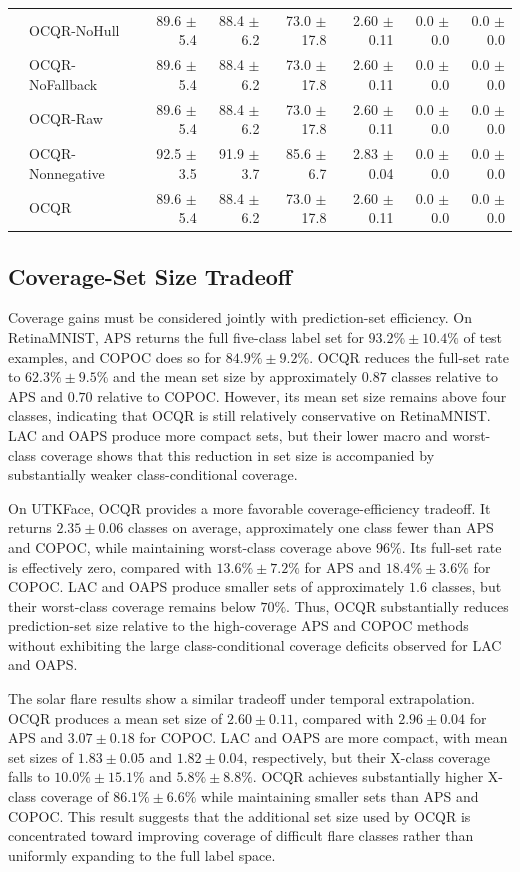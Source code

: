 \documentclass[conference]{IEEEtran}
\begin{document}
\begin{table}[t]
{\begin{tabular}{llrrrrrr}
& OCQR-NoHull & 89.6 $\pm$ 5.4 & 88.4 $\pm$ 6.2 & 73.0 $\pm$ 17.8 & 2.60 $\pm$ 0.11 & 0.0 $\pm$ 0.0 & 0.0 $\pm$ 0.0 \\
& OCQR-NoFallback & 89.6 $\pm$ 5.4 & 88.4 $\pm$ 6.2 & 73.0 $\pm$ 17.8 & 2.60 $\pm$ 0.11 & 0.0 $\pm$ 0.0 & 0.0 $\pm$ 0.0 \\
& OCQR-Raw & 89.6 $\pm$ 5.4 & 88.4 $\pm$ 6.2 & 73.0 $\pm$ 17.8 & 2.60 $\pm$ 0.11 & 0.0 $\pm$ 0.0 & 0.0 $\pm$ 0.0 \\
& OCQR-Nonnegative & 92.5 $\pm$ 3.5 & 91.9 $\pm$ 3.7 & 85.6 $\pm$ 6.7 & 2.83 $\pm$ 0.04 & 0.0 $\pm$ 0.0 & 0.0 $\pm$ 0.0 \\
& OCQR & 89.6 $\pm$ 5.4 & 88.4 $\pm$ 6.2 & 73.0 $\pm$ 17.8 & 2.60 $\pm$ 0.11 & 0.0 $\pm$ 0.0 & 0.0 $\pm$ 0.0 \\
\bottomrule
\end{tabular}
}
\end{table}

\subsection{Coverage-Set Size Tradeoff}
Coverage gains must be considered jointly with prediction-set efficiency. On RetinaMNIST, APS returns the full five-class label set for \(93.2\%\pm10.4\%\) of test examples, and COPOC does so for \(84.9\%\pm9.2\%\). OCQR reduces the full-set rate to \(62.3\%\pm9.5\%\) and the mean set size by approximately \(0.87\) classes relative to APS and \(0.70\) relative to COPOC. However, its mean set size remains above four classes, indicating that OCQR is still relatively conservative on RetinaMNIST. LAC and OAPS produce more compact sets, but their lower macro and worst-class coverage shows that this reduction in set size is accompanied by substantially weaker class-conditional coverage.

On UTKFace, OCQR provides a more favorable coverage-efficiency tradeoff. It returns \(2.35\pm0.06\) classes on average, approximately one class fewer than APS and COPOC, while maintaining worst-class coverage above \(96\%\). Its full-set rate is effectively zero, compared with \(13.6\%\pm7.2\%\) for APS and \(18.4\%\pm3.6\%\) for COPOC. LAC and OAPS produce smaller sets of approximately \(1.6\) classes, but their worst-class coverage remains below \(70\%\). Thus, OCQR substantially reduces prediction-set size relative to the high-coverage APS and COPOC methods without exhibiting the large class-conditional coverage deficits observed for LAC and OAPS.

The solar flare results show a similar tradeoff under temporal extrapolation. OCQR produces a mean set size of \(2.60\pm0.11\), compared with \(2.96\pm0.04\) for APS and \(3.07\pm0.18\) for COPOC. LAC and OAPS are more compact, with mean set sizes of \(1.83\pm0.05\) and \(1.82\pm0.04\), respectively, but their X-class coverage falls to \(10.0\%\pm15.1\%\) and \(5.8\%\pm8.8\%\). OCQR achieves substantially higher X-class coverage of \(86.1\%\pm6.6\%\) while maintaining smaller sets than APS and COPOC. This result suggests that the additional set size used by OCQR is concentrated toward improving coverage of difficult flare classes rather than uniformly expanding to the full label space.
\end{document}
